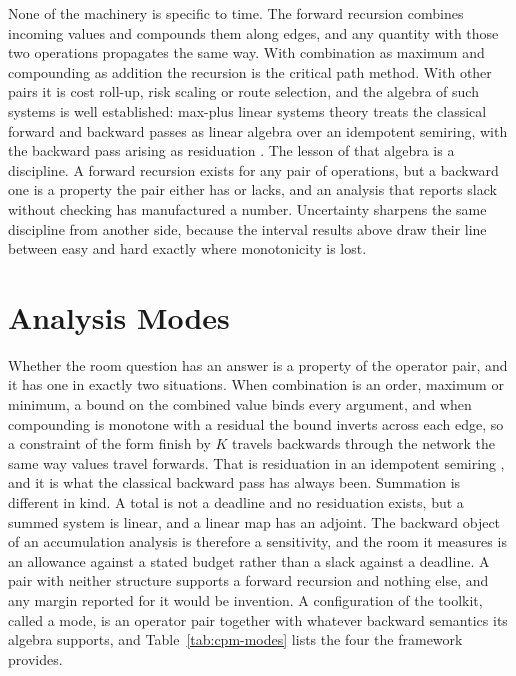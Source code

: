 \documentclass[12pt]{report}
\begin{document}
None of the machinery is specific to time. The forward recursion combines
incoming values and compounds them along edges, and any quantity with those
two operations propagates the same way. With combination as maximum and
compounding as addition the recursion is the critical path method. With other
pairs it is cost roll-up, risk scaling or route selection, and the algebra of
such systems is well established: max-plus linear systems theory treats the
classical forward and backward passes as linear algebra over an idempotent
semiring, with the backward pass arising as residuation
\cite{baccelli1992sync}. The lesson of that algebra is a discipline. A
forward recursion exists for any pair of operations, but a backward one is a
property the pair either has or lacks, and an analysis that reports slack
without checking has manufactured a number. Uncertainty sharpens the same
discipline from another side, because the interval results above draw their
line between easy and hard exactly where monotonicity is lost.

\section{Analysis Modes}
\label{sec:cpm-modes}

Whether the room question has an answer is a property of the operator pair,
and it has one in exactly two situations. When combination is an order,
maximum or minimum, a bound on the combined value binds every argument, and
when compounding is monotone with a residual the bound inverts across each
edge, so a constraint of the form finish by $K$ travels backwards through
the network the same way values travel forwards. That is residuation in an
idempotent semiring \cite{baccelli1992sync}, and it is what the classical
backward pass has always been. Summation is different in kind. A total is
not a deadline and no residuation exists, but a summed system is linear,
and a linear map has an adjoint. The backward object of an accumulation
analysis is therefore a sensitivity, and the room it measures is an
allowance against a stated budget rather than a slack against a deadline.
A pair with neither structure supports a forward recursion and nothing
else, and any margin reported for it would be invention. A configuration of
the toolkit, called a mode, is an operator pair together with whatever
backward semantics its algebra supports, and Table~\ref{tab:cpm-modes}
lists the four the framework provides.
\end{document}
